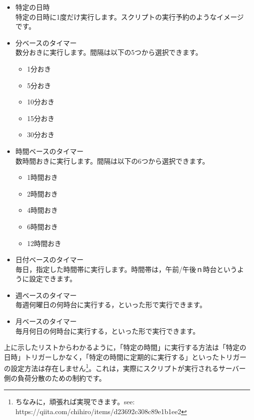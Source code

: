 \documentclass[uplatex,a4j]{jsarticle}
\begin{document}
\begin{itemize}
\item 特定の日時\\
特定の日時に1度だけ実行します。スクリプトの実行予約のようなイメージです。
\item 分ベースのタイマー\\
数分おきに実行します。間隔は以下の5つから選択できます。
\begin{itemize}
\item 1分おき
\item 5分おき
\item 10分おき
\item 15分おき
\item 30分おき
\end{itemize}
\item 時間ベースのタイマー\\
数時間おきに実行します。間隔は以下の6つから選択できます。
\begin{itemize}
\item 1時間おき
\item 2時間おき
\item 4時間おき
\item 6時間おき
\item 12時間おき
\end{itemize}
\item 日付ベースのタイマー\\
毎日，指定した時間帯に実行します。時間帯は，午前/午後ｎ時台というように設定できます。
\item 週ベースのタイマー\\
毎週何曜日の何時台に実行する，といった形で実行できます。
\item 月ベースのタイマー\\
毎月何日の何時台に実行する，といった形で実行できます。
\end{itemize}

上に示したリストからわかるように，「特定の時間」に実行する方法は「特定の日時」トリガーしかなく，「特定の時間に定期的に実行する」といったトリガーの設定方法は存在しません\footnote{ちなみに，頑張れば実現できます。see: https://qiita.com/chihiro/items/d23692c308c89e1b1ee2}。これは，実際にスクリプトが実行されるサーバー側の負荷分散のための制約です。
\end{document}
